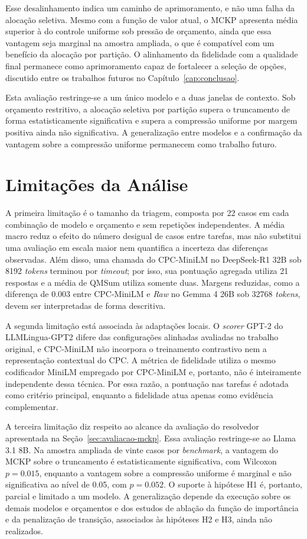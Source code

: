 Esse desalinhamento indica um caminho de aprimoramento, e não uma falha da alocação seletiva. Mesmo com a função de valor atual, o MCKP apresenta média superior à do controle uniforme sob pressão de orçamento, ainda que essa vantagem seja marginal na amostra ampliada, o que é compatível com um benefício da alocação por partição. O alinhamento da fidelidade com a qualidade final permanece como aprimoramento capaz de fortalecer a seleção de opções, discutido entre os trabalhos futuros no Capítulo~\ref{cap:conclusao}.

Esta avaliação restringe-se a um único modelo e a duas janelas de contexto. Sob orçamento restritivo, a alocação seletiva por partição supera o truncamento de forma estatisticamente significativa e supera a compressão uniforme por margem positiva ainda não significativa. A generalização entre modelos e a confirmação da vantagem sobre a compressão uniforme permanecem como trabalho futuro.

\section{Limitações da Análise}
\label{sec:limitacoes-resultados}

A primeira limitação é o tamanho da triagem, composta por 22 casos em cada combinação de modelo e orçamento e sem repetições independentes. A média macro reduz o efeito do número desigual de casos entre tarefas, mas não substitui uma avaliação em escala maior nem quantifica a incerteza das diferenças observadas. Além disso, uma chamada do CPC-MiniLM no DeepSeek-R1 32B sob 8192 \textit{tokens} terminou por \textit{timeout}; por isso, sua pontuação agregada utiliza 21 respostas e a média de QMSum utiliza somente duas. Margens reduzidas, como a diferença de 0.003 entre CPC-MiniLM e \textit{Raw} no Gemma 4 26B sob 32768 \textit{tokens}, devem ser interpretadas de forma descritiva.

A segunda limitação está associada às adaptações locais. O \textit{scorer} GPT-2 do LLMLingua-GPT2 difere das configurações alinhadas avaliadas no trabalho original, e CPC-MiniLM não incorpora o treinamento contrastivo nem a representação contextual do CPC. A métrica de fidelidade utiliza o mesmo codificador MiniLM empregado por CPC-MiniLM e, portanto, não é inteiramente independente dessa técnica. Por essa razão, a pontuação nas tarefas é adotada como critério principal, enquanto a fidelidade atua apenas como evidência complementar.

A terceira limitação diz respeito ao alcance da avaliação do resolvedor apresentada na Seção~\ref{sec:avaliacao-mckp}. Essa avaliação restringe-se ao Llama 3.1 8B. Na amostra ampliada de vinte casos por \textit{benchmark}, a vantagem do MCKP sobre o truncamento é estatisticamente significativa, com Wilcoxon $p = 0.015$, enquanto a vantagem sobre a compressão uniforme é marginal e não significativa ao nível de 0.05, com $p = 0.052$. O suporte à hipótese H1 é, portanto, parcial e limitado a um modelo. A generalização depende da execução sobre os demais modelos e orçamentos e dos estudos de ablação da função de importância e da penalização de transição, associados às hipóteses H2 e H3, ainda não realizados.


